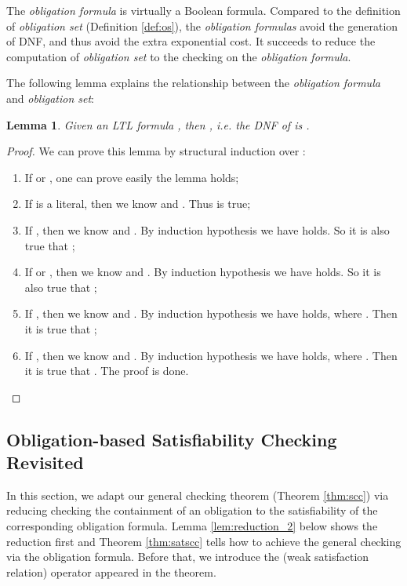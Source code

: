 \documentclass[conference]{IEEEtran}
\newtheorem{lemma}{Lemma}
\newtheorem{proof}{IEEEproof}
\begin{document}
The \textit{obligation formula} is virtually a Boolean formula.
Compared to the definition of \textit{obligation set} (Definition
\ref{def:os}), the \textit{obligation formulas} avoid the generation
of DNF, and thus avoid the extra exponential cost. It succeeds to
reduce the computation of \textit{obligation set} to the checking on
the \textit{obligation formula}.

The following lemma explains the relationship between the \textit{obligation formula} and \textit{obligation set}:

\begin{lemma}\label{lemma:ofandos}
  Given an LTL formula , then
  ,
  i.e. the DNF of  is
  .
\end{lemma}
\begin{proof}
  We can prove this lemma by structural induction over :
  \begin{enumerate}
    \item If  or , one can prove easily the lemma holds;
    \item If  is a literal, then we know  and . Thus 
     is true;
    \item If , then we know  and . By induction 
    hypothesis we have  holds. So 
    it is also true that ;
    \item If  or , then we know  and 
    . By induction hypothesis we have  holds. So 
    it is also true that ;
    \item If , then we know  and 
    . By induction hypothesis we have  holds, where . Then it is true that 
    ;
    \item If , then we know  and 
    .  By induction hypothesis we have  holds, where . Then it is true that 
    . The proof is done.
  \end{enumerate}
\end{proof}

\iffalse
The correctness of the lemma is directly guaranteed by the definitions of \textit{obligation formula} (Definition \ref{def:of}) and \textit{obligation set} (Definition \ref{def:os}).
\fi



\subsection{Obligation-based Satisfiability Checking Revisited}


In this section, we adapt our general checking theorem (Theorem
\ref{thm:scc}) via reducing checking the containment of an obligation
to the satisfiability of the corresponding obligation formula. Lemma
\ref{lem:reduction_2} below shows the reduction first and Theorem
\ref{thm:satscc} tells how to achieve the general checking via the
obligation formula. Before that, we introduce the  (weak satisfaction relation) 
operator appeared in the theorem.
\end{document}
